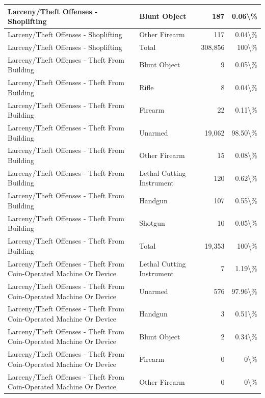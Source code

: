 \documentclass[
]{krantz}
\begin{document}
\begin{longtable}[t]{l|l|r|r}
\hline
Larceny/Theft Offenses - Shoplifting & Blunt Object & 187 & 0.06\textbackslash{}\%\\
\hline
Larceny/Theft Offenses - Shoplifting & Other Firearm & 117 & 0.04\textbackslash{}\%\\
\hline
Larceny/Theft Offenses - Shoplifting & Total & 308,856 & 100\textbackslash{}\%\\
\hline
Larceny/Theft Offenses - Theft From Building & Blunt Object & 9 & 0.05\textbackslash{}\%\\
\hline
Larceny/Theft Offenses - Theft From Building & Rifle & 8 & 0.04\textbackslash{}\%\\
\hline
Larceny/Theft Offenses - Theft From Building & Firearm & 22 & 0.11\textbackslash{}\%\\
\hline
Larceny/Theft Offenses - Theft From Building & Unarmed & 19,062 & 98.50\textbackslash{}\%\\
\hline
Larceny/Theft Offenses - Theft From Building & Other Firearm & 15 & 0.08\textbackslash{}\%\\
\hline
Larceny/Theft Offenses - Theft From Building & Lethal Cutting Instrument & 120 & 0.62\textbackslash{}\%\\
\hline
Larceny/Theft Offenses - Theft From Building & Handgun & 107 & 0.55\textbackslash{}\%\\
\hline
Larceny/Theft Offenses - Theft From Building & Shotgun & 10 & 0.05\textbackslash{}\%\\
\hline
Larceny/Theft Offenses - Theft From Building & Total & 19,353 & 100\textbackslash{}\%\\
\hline
Larceny/Theft Offenses - Theft From Coin-Operated Machine Or Device & Lethal Cutting Instrument & 7 & 1.19\textbackslash{}\%\\
\hline
Larceny/Theft Offenses - Theft From Coin-Operated Machine Or Device & Unarmed & 576 & 97.96\textbackslash{}\%\\
\hline
Larceny/Theft Offenses - Theft From Coin-Operated Machine Or Device & Handgun & 3 & 0.51\textbackslash{}\%\\
\hline
Larceny/Theft Offenses - Theft From Coin-Operated Machine Or Device & Blunt Object & 2 & 0.34\textbackslash{}\%\\
\hline
Larceny/Theft Offenses - Theft From Coin-Operated Machine Or Device & Firearm & 0 & 0\textbackslash{}\%\\
\hline
Larceny/Theft Offenses - Theft From Coin-Operated Machine Or Device & Other Firearm & 0 & 0\textbackslash{}\%\\
\hline

\end{longtable}
\end{document}
